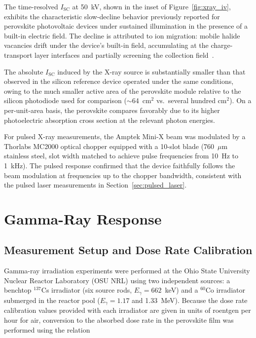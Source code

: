 The time-resolved $I_{\mathrm{SC}}$ at 50~kV, shown in the inset of
Figure~\ref{fig:xray_iv}, exhibits the characteristic slow-decline
behavior previously reported for perovskite photovoltaic devices
under sustained illumination in the presence of a built-in electric
field.  The decline is attributed to ion migration: mobile halide
vacancies drift under the device's built-in field, accumulating at
the charge-transport layer interfaces and partially screening the
collection field~\cite{Thiesbrummel2024ionmig,Eames2015}.

The absolute $I_{\mathrm{SC}}$ induced by the X-ray source is substantially
smaller than that observed in the silicon reference device operated under
the same conditions, owing to the much smaller active area of the
perovskite module relative to the silicon photodiode used for comparison
($\sim$64~cm$^2$ vs.\ several hundred cm$^2$).  On a per-unit-area basis,
the perovskite compares favorably due to its higher photoelectric
absorption cross section at the relevant photon energies.

For pulsed X-ray measurements, the Amptek Mini-X beam was modulated by
a Thorlabs MC2000 optical chopper equipped with a 10-slot blade
(760~$\mu$m stainless steel, slot width matched to achieve pulse
frequencies from 10~Hz to 1~kHz).  The pulsed response confirmed that
the device faithfully follows the beam modulation at frequencies up
to the chopper bandwidth, consistent with the pulsed laser measurements
in Section~\ref{sec:pulsed_laser}.

\section{Gamma-Ray Response}
\label{sec:gamma_response}

\subsection{Measurement Setup and Dose Rate Calibration}

Gamma-ray irradiation experiments were performed at the Ohio State
University Nuclear Reactor Laboratory (OSU NRL) using two
independent sources: a benchtop $^{137}$Cs irradiator
(six source rods, $E_\gamma = 662$~keV) and a $^{60}$Co irradiator
submerged in the reactor pool ($E_\gamma = 1.17$ and 1.33~MeV).
Because the dose rate calibration values provided with each irradiator
are given in units of roentgen per hour for air, conversion to the
absorbed dose rate in the perovskite film was performed using the
relation

